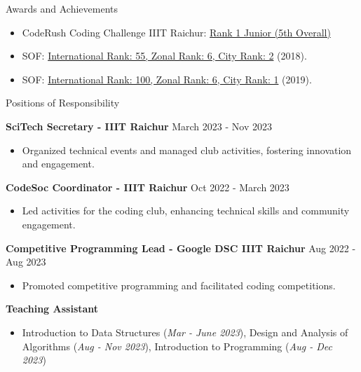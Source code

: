 \documentclass{resume}
\begin{document}
\begin{rSection}{Awards and Achievements}

    \begin{itemize}
        \itemsep -3pt {}
        \item CodeRush Coding Challenge IIIT Raichur: \href{https://drive.google.com/file/d/1BdOPAlKCXyNEZf-ujJ5Iu8lBBra77hJg/view?usp=sharing}{Rank 1 Junior (5th Overall)}
        \item SOF: \href{https://drive.google.com/file/d/1b_JE3MbNI2eW9xpYvC1NWCfUGChuEVBy/view?usp=sharing}{International Rank: 55, Zonal Rank: 6, City Rank: 2} (2018).
        \item SOF: \href{https://drive.google.com/file/d/1bnRRCB6FZKDpJm0-Ogz15o56iG2QN_1t/view?usp=sharing}{International Rank: 100, Zonal Rank: 6, City Rank: 1} (2019).
    \end{itemize}

\end{rSection}


\begin{rSection}{Positions of Responsibility}

    \textbf{SciTech Secretary - IIIT Raichur} \hfill March 2023 - Nov 2023
    \begin{itemize}
        \itemsep -3pt {}
        \item Organized technical events and managed club activities, fostering innovation and engagement.
    \end{itemize}

    \textbf{CodeSoc Coordinator - IIIT Raichur} \hfill Oct 2022 - March 2023
    \begin{itemize}
        \itemsep -3pt {}
        \item Led activities for the coding club, enhancing technical skills and community engagement.
    \end{itemize}

    \textbf{Competitive Programming Lead - Google DSC IIIT Raichur} \hfill Aug 2022 - Aug 2023
    \begin{itemize}
        \itemsep -3pt {}
        \item Promoted competitive programming and facilitated coding competitions.
    \end{itemize}

    \textbf{Teaching Assistant}
    \begin{itemize}
        \itemsep -3pt {}
        \item Introduction to Data Structures (\textit{Mar - June 2023}), Design and Analysis of Algorithms (\textit{Aug - Nov 2023}), Introduction to Programming (\textit{Aug - Dec 2023})
    \end{itemize}

\end{rSection}
\end{document}
